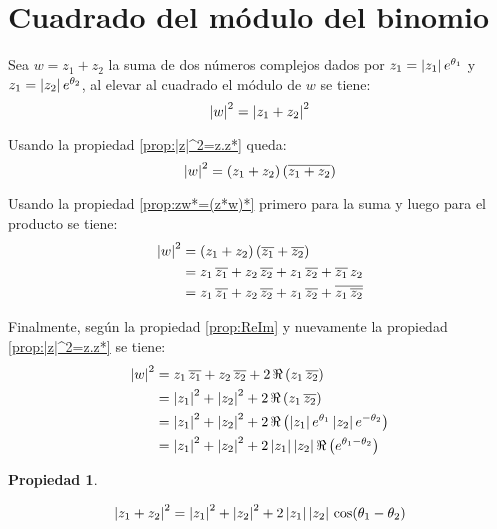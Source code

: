 \documentclass[a5paper,12pt,twoside]{book}
\newtheorem{prop}{{Propiedad}}[chapter]
\begin{document}
\section{Cuadrado del módulo del binomio}

Sea $w=z_1+z_2$ la suma de dos números complejos dados por $z_1={\left| {z_1} \right|} \, e^{\theta_1}$ y $z_1={\left| {z_2} \right|} \, e^{\theta_2}$, al elevar al cuadrado el módulo de $w$ se tiene:
\begin{equation*}
    {\left| {w} \right|}^2 = {\left| {z_1+z_2} \right|}^2
\end{equation*}

Usando la propiedad \ref{prop:|z|^2=z.z*} queda:
\begin{equation*}
    {\left| {w} \right|}^2 = \left(z_1+z_2\right) \left( \overline{z_1+z_2} \right)
\end{equation*}

Usando la propiedad \ref{prop:zw*=(z*w)*} primero para la suma y luego para el producto se tiene:
\begin{align*}
    {\left| {w} \right|}^2 &= \left(z_1+z_2\right) \left(\overline{z_1}+\overline{z_2}\right)
    \\
    &= z_1 \, \overline{z_1} + z_2 \, \overline{z_2} + z_1 \, \overline{z_2} + \overline{z_1} \, z_2
    \\
    &= z_1 \, \overline{z_1} + z_2 \, \overline{z_2} + z_1 \, \overline{z_2} + \overline{z_1 \, \overline{z_2}}
\end{align*}

Finalmente, según la propiedad \ref{prop:ReIm} y nuevamente la propiedad \ref{prop:|z|^2=z.z*} se tiene:
\begin{align*}
    {\left| {w} \right|}^2 &= z_1 \, \overline{z_1} + z_2 \, \overline{z_2} + 2 \, \Re \left( z_1 \, \overline{z_2} \right)
    \\
    &= {\left| {z_1} \right|}^2 + {\left| {z_2} \right|}^2 + 2 \, \Re \left( z_1 \, \overline{z_2} \right)
    \\
    &= {\left| {z_1} \right|}^2 + {\left| {z_2} \right|}^2 + 2 \, \Re \left( {\left| {z_1} \right|} \, e^{\theta_1} \, {\left| {z_2} \right|} \, e^{-\theta_2} \right)
    \\
    &= {\left| {z_1} \right|}^2 + {\left| {z_2} \right|}^2 + 2 \, {\left| {z_1} \right|} \, {\left| {z_2} \right|} \, \Re \left( e^{\theta_1-\theta_2} \right)
\end{align*}

\begin{mdframed}[style=PropertyFrame]
    \begin{prop}
    \end{prop}
    \begin{equation*}
        {\left| {z_1 + z_2} \right|}^2 = {\left| {z_1} \right|}^2 + {\left| {z_2} \right|}^2 + 2 \, {\left| {z_1} \right|} \, {\left| {z_2} \right|} \, \cos (\theta_1-\theta_2)
    \end{equation*}
\end{mdframed}
\end{document}
